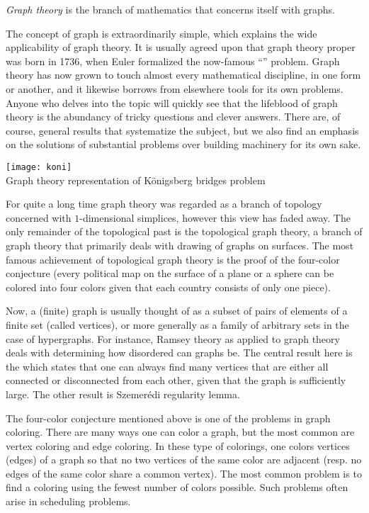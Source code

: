 \documentclass[12pt]{article}
\begin{document}
\emph{Graph theory} is the branch of mathematics that concerns itself with graphs.

The concept of graph is extraordinarily simple, which explains the wide applicability of graph theory. It is usually agreed upon that graph theory proper was born in 1736, when Euler formalized the now-famous ``'' problem. Graph theory has now grown to touch almost every mathematical discipline, in one form or another, and it likewise borrows from elsewhere tools for its own problems. Anyone who delves into the topic will quickly see that the lifeblood of graph theory is the abundancy of tricky questions and clever answers. There are, of course, general results that systematize the subject, but we also find an emphasis on the solutions of substantial problems over building machinery for its own sake.
\begin{center}
\texttt{[image: koni]}\\
Graph theory representation of K\"onigsberg bridges problem
\end{center}

For quite a long time graph theory was regarded as a branch of topology concerned with $1$-dimensional simplices, however this view has faded away. The only remainder of the topological past is the topological graph theory, a branch of graph theory that primarily deals with drawing of graphs on surfaces. The most famous achievement of topological graph theory is the proof of the four-color conjecture (every political map on the surface of a plane or a sphere can be colored into four colors given that each country consists of only one piece).

Now, a (finite) graph is usually thought of as a subset of pairs of elements of a finite set (called vertices), or more generally as a family of arbitrary sets in the case of hypergraphs. For instance, Ramsey theory as applied to graph theory deals with determining how disordered can graphs be. The central result here is the  which states that one can always find many vertices that are either all connected or disconnected from each other, given that the graph is sufficiently large. The other result is Szemer\'edi regularity lemma.

The four-color conjecture mentioned above is one of the problems in graph coloring. There are many ways one can color a graph, but the most common are vertex coloring and edge coloring. In these type of colorings, one colors vertices (edges) of a graph so that no two vertices of the same color are adjacent (resp. no edges of the same color share a common vertex). The most common problem is to find a coloring using the fewest number of colors possible. Such problems often arise in scheduling problems.
\end{document}
